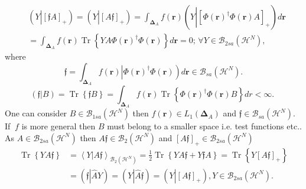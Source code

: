 \documentclass[aps,preprint]{revtex4}%
\begin{document}
\begin{align}
&  \left(  Y\left\vert \left[  \mathfrak{f}A\right]  _{+}\right.  \right)
=\left(  Y\left\vert \left[  A\mathfrak{f}\right]  _{+}\right.  \right)
=\int_{\boldsymbol{\Delta}_{A}}f\left(  \boldsymbol{r}\right)  \left(
Y\left\vert \left[  \Phi\left(  \boldsymbol{r}\right)  ^{\dagger}\Phi\left(
\boldsymbol{r}\right)  A\right]  _{+}\right.  \right)  d\boldsymbol{r}\\
&  =\int_{\boldsymbol{\Delta}_{A}}f\left(  \boldsymbol{r}\right)
\operatorname{Tr}\left\{  YA\Phi\left(  \boldsymbol{r}\right)  ^{\dagger}%
\Phi\left(  \boldsymbol{r}\right)  \right\}  d\boldsymbol{r}=0;\,\forall
Y\in\mathcal{B}_{2sa}\left(  \mathcal{H}^{N}\right)  ,
\end{align}
where
\begin{equation}
\mathfrak{f=}\int_{\boldsymbol{\Delta}_{A}}f\left(  \boldsymbol{r}\right)
\left\vert \Phi\left(  \boldsymbol{r}\right)  ^{\dagger}\Phi\left(
\boldsymbol{r}\right)  \right)  d\boldsymbol{r}\in\mathcal{B}_{sa}\left(
\mathcal{H}^{N}\right)  .
\end{equation}%
\begin{equation}
\left(  \mathfrak{f}\left\vert B\right.  \right)  =\operatorname{Tr}\left\{
\mathfrak{f}B\right\}  =\int_{\boldsymbol{\Delta}_{A}}f\left(  \boldsymbol{r}%
\right)  \operatorname{Tr}\left\{  \Phi\left(  \boldsymbol{r}\right)
^{\dagger}\Phi\left(  \boldsymbol{r}\right)  B\right\}  dr<\infty\text{. }%
\end{equation}
One can consider $B\in\mathcal{B}_{1sa}\left(  \mathcal{H}^{N}\right)  $ then
$f\left(  \boldsymbol{r}\right)  \in L_{1}\left(  \boldsymbol{\Delta}%
_{A}\right)  $ and $\mathfrak{f}\in\mathcal{B}_{sa}\left(  \mathcal{H}%
^{N}\right)  .$ If $\ f$ is more general then $B$ must belong to a smaller
space i.e. test functions etc.. As $A\in\mathcal{B}_{2sa}\left(
\mathcal{H}^{N}\right)  $ then $A\mathfrak{f}\in\mathcal{B}_{2}\left(
\mathcal{H}^{N}\right)  $ and $\left[  A\mathfrak{f}\right]  _{+}%
\in\mathcal{B}_{2sa}\left(  \mathcal{H}^{N}\right)  $
\begin{align*}
\operatorname{Tr}\left\{  YA\mathfrak{f}\right\}   &  =\left\langle
Y\left\vert A\mathfrak{f}\right.  \right\rangle _{\mathcal{B}_{2}\left(
\mathcal{H}^{N}\right)  }=\frac{1}{2}\operatorname{Tr}\left\{  YA\mathfrak{f}%
+Y\mathfrak{f}A\right\}  =\operatorname{Tr}\left\{  Y\left[  A\mathfrak{f}%
\right]  _{+}\right\}  \\
&  =\left(  \mathfrak{f}\left\vert \widehat{A}\right.  Y\right)  =\left(
Y\left\vert \widehat{A}\right.  \mathfrak{f}\right)  =\left(  Y\left\vert
\left[  A\mathfrak{f}\right]  _{+}\right.  \right)  ,Y\in\mathcal{B}%
_{2sa}\left(  \mathcal{H}^{N}\right)  .
\end{align*}
\end{document}
